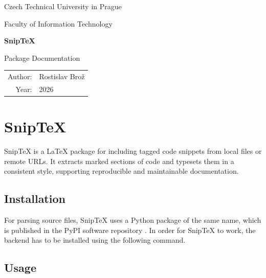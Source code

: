 \documentclass{article}
\begin{document}
\hypersetup{pageanchor=false}
\begin{titlepage}
    \centering

    {\Large Czech Technical University in Prague\par}
    {\Large Faculty of Information Technology\par}

    \vspace{3cm}

    {\Huge\bfseries Snip\TeX\par}

    \vspace{0.5cm}

    {\Large Package Documentation\par}

    \vfill

    \begin{tabular}{rl}
        Author: & Rostislav Brož \\
        Year: & 2026 \\
    \end{tabular}

    \vspace{2cm}
\end{titlepage}

\hypersetup{pageanchor=true}
\clearpage
{}

\section*{Snip\TeX}

Snip\TeX{} is a La\TeX{} package for including tagged code snippets from local files or remote URLs. 
It extracts marked sections of code and typesets them in a consistent style, 
supporting reproducible and maintainable documentation.

\subsection*{Installation}

For parsing source files, Snip\TeX{} uses a Python package of the same name, 
which is published in the PyPI software repository \citep{pypi}. 
In order for Snip\TeX{} to work, 
the backend has to be installed using the following command.


\subsection*{Usage}
\end{document}
